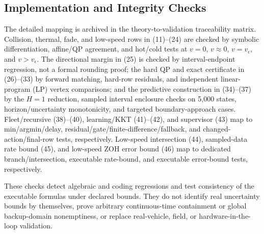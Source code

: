 \subsection{Implementation and Integrity Checks}
The detailed mapping is archived in the theory-to-validation traceability matrix. Collision, thermal, fade, and low-speed rows in (11)--(24) are checked by symbolic differentiation, affine/QP agreement, and hot/cold tests at $v=0$, $v\approx0$, $v=v_\epsilon$, and $v>v_\epsilon$. The directional margin in (25) is checked by interval-endpoint regression, not a formal rounding proof; the hard QP and exact certificate in (26)--(33) by forward matching, hard-row residuals, and independent linear-program (LP) vertex comparisons; and the predictive construction in (34)--(37) by the $H=1$ reduction, sampled interval enclosure checks on 5,000 states, horizon/uncertainty monotonicity, and targeted boundary-approach cases. Fleet/recursive (38)--(40), learning/KKT (41)--(42), and supervisor (43) map to min/argmin/delay, residual/gate/finite-difference/fallback, and changed-action/final-row tests, respectively. Low-speed intersection (44), sampled-data rate bound (45), and low-speed ZOH error bound (46) map to dedicated branch/intersection, executable rate-bound, and executable error-bound tests, respectively.

These checks detect algebraic and coding regressions and test consistency of the executable formulas under declared bounds. They do not identify real uncertainty bounds by themselves, prove arbitrary continuous-time containment or global backup-domain nonemptiness, or replace real-vehicle, field, or hardware-in-the-loop validation.
